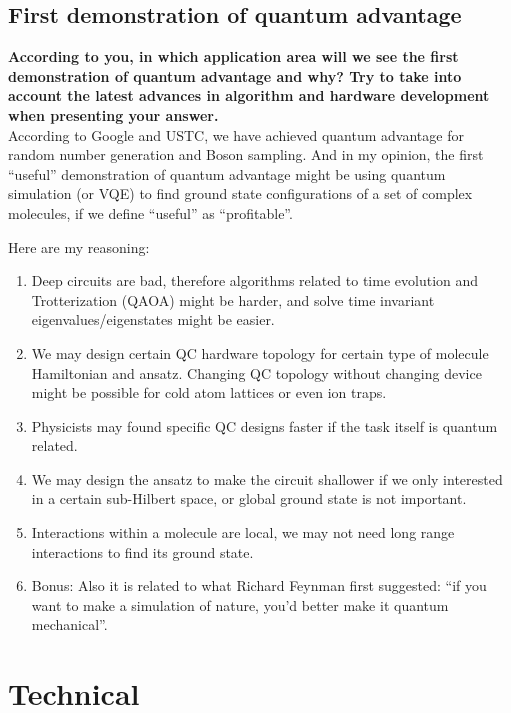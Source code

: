 \documentclass{article}
\begin{document}
\newpage
\subsection{First demonstration of quantum advantage}
\textbf{According to you, in which application area will we see the first demonstration of quantum advantage and why? Try to take into account the latest advances in algorithm and hardware development when presenting your answer.}\\

According to Google and USTC, we have achieved quantum advantage for random number generation and Boson sampling. And in my opinion, the first ``useful'' demonstration of quantum advantage might be using quantum simulation (or VQE) to find ground state configurations of a set of complex molecules, if we define ``useful'' as ``profitable''. 

Here are my reasoning: 

\begin{enumerate}

\item Deep circuits are bad, therefore algorithms related to time evolution and Trotterization (QAOA) might be harder, and solve time invariant  eigenvalues/eigenstates might be easier.

\item We may design certain QC hardware topology for certain type of molecule Hamiltonian and ansatz. Changing QC topology without changing device might be possible for cold atom lattices or even ion traps. 

\item Physicists may found specific QC designs faster if the task itself is quantum related. 

\item We may design the ansatz to make the circuit shallower if we only interested in a certain sub-Hilbert space, or global ground state is not important.

\item Interactions within a molecule are local, we may not need long range interactions to find its ground state.

\item Bonus: Also it is related to what Richard Feynman first suggested: ``if you want to make a simulation of nature, you’d better make it quantum mechanical''.
\end{enumerate}


\newpage
\section{Technical}
\end{document}
